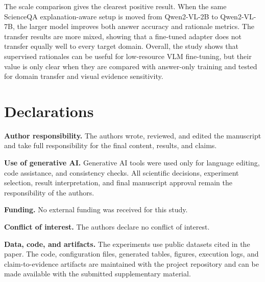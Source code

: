 \documentclass[preprint,12pt]{elsarticle}
\begin{document}
The scale comparison gives the clearest positive result.
When the same ScienceQA explanation-aware setup is moved from Qwen2-VL-2B to Qwen2-VL-7B, the larger model improves both answer accuracy and rationale metrics.
The transfer results are more mixed, showing that a fine-tuned adapter does not transfer equally well to every target domain.
Overall, the study shows that supervised rationales can be useful for low-resource VLM fine-tuning, but their value is only clear when they are compared with answer-only training and tested for domain transfer and visual evidence sensitivity.

\section*{Declarations}
\textbf{Author responsibility.}
The authors wrote, reviewed, and edited the manuscript and take full responsibility for the final content, results, and claims.

\textbf{Use of generative AI.}
Generative AI tools were used only for language editing, code assistance, and consistency checks.
All scientific decisions, experiment selection, result interpretation, and final manuscript approval remain the responsibility of the authors.

\textbf{Funding.}
No external funding was received for this study.

\textbf{Conflict of interest.}
The authors declare no conflict of interest.

\textbf{Data, code, and artifacts.}
The experiments use public datasets cited in the paper.
The code, configuration files, generated tables, figures, execution logs, and claim-to-evidence artifacts are maintained with the project repository and can be made available with the submitted supplementary material.



\end{document}
